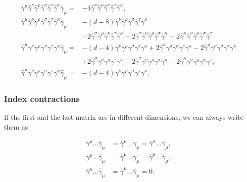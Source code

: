 \documentclass[../FeynCalcManual.tex]{subfiles}
\begin{document}
\begin{align}
\bar{\gamma}^\mu \hat{\gamma}^\nu \hat{\gamma}^\rho \hat{\gamma}^\sigma \hat{\gamma}^\tau \hat{\gamma}^\kappa \bar{\gamma}_\mu =& -4 \hat{\gamma}^\nu \hat{\gamma}^\rho \hat{\gamma}^\sigma \hat{\gamma}^\tau \hat{\gamma}^\kappa , \\
\hat{\gamma}^\mu \hat{\gamma}^\nu \hat{\gamma}^\rho \hat{\gamma}^\sigma \hat{\gamma}^\tau \hat{\gamma}^\kappa \hat{\gamma}_\mu =& -(d-8) \hat{\gamma}^\nu \hat{\gamma}^\rho \hat{\gamma}^\sigma \hat{\gamma}^\tau \hat{\gamma}^\kappa  \\
&- 2  \hat{\gamma}^\sigma \hat{\gamma}^\rho \hat{\gamma}^\nu \hat{\gamma}^\tau \hat{\gamma}^\kappa - 2 \hat{\gamma}^\tau \hat{\gamma}^\nu \hat{\gamma}^\rho \hat{\gamma}^\sigma \hat{\gamma}^\kappa + 2 \hat{\gamma}^\kappa \hat{\gamma}^\nu \hat{\gamma}^\rho \hat{\gamma}^\sigma \hat{\gamma}^\tau \\
\hat{\gamma}^\mu \gamma^\nu \gamma^\rho \gamma^\sigma \gamma^\tau \gamma^\kappa \hat{\gamma}_\mu =& -(d-4) \gamma^\nu \gamma^\rho \gamma^\sigma \gamma^\tau \gamma^\kappa +  2 \hat{\gamma}^\nu \gamma^\rho \gamma^\sigma \gamma^\tau  \gamma^\kappa - 2\hat{\gamma}^\rho \gamma^\nu \gamma^\sigma \gamma^\tau \gamma^\kappa \\
& + 2 \hat{\gamma}^\sigma \gamma^\nu \gamma^\rho \gamma^\tau \gamma^\kappa  - 2 \hat{\gamma}^\tau \gamma^\nu \gamma^\rho \gamma^\sigma \gamma^\kappa +2 \hat{\gamma}^\kappa \gamma^\nu \gamma^\rho \gamma^\sigma \gamma^\tau,  \\
\hat{\gamma}^\mu \bar{\gamma}^\nu \bar{\gamma}^\rho \bar{\gamma}^\sigma \bar{\gamma}^\tau \bar{\gamma}^\kappa \hat{\gamma}_\mu =& -(d-4) \bar{\gamma}^\nu \bar{\gamma}^\rho \bar{\gamma}^\sigma \bar{\gamma}^\tau \bar{\gamma}^\kappa,
\end{align}

\hypertarget{index-contractions}{%
\subsubsection{Index contractions}\label{index-contractions}}

If the first and the last matrix are in different dimensions, we can
always write them as

\begin{align}
\gamma^\mu \dots \bar{\gamma}_\mu & = \bar{\gamma}^\mu \dots \gamma_\mu = \bar{\gamma}^\mu \dots \bar{\gamma}_\mu, \\
\gamma^\mu \dots \hat{\gamma}_\mu & = \hat{\gamma}^\mu \dots \gamma_\mu = \hat{\gamma}^\mu \dots \hat{\gamma}_\mu, \\
\bar{\gamma}^\mu \dots \hat{\gamma}_\mu & = \hat{\gamma}^\mu \dots \bar{\gamma}_\mu = 0.
\end{align}
\end{document}
